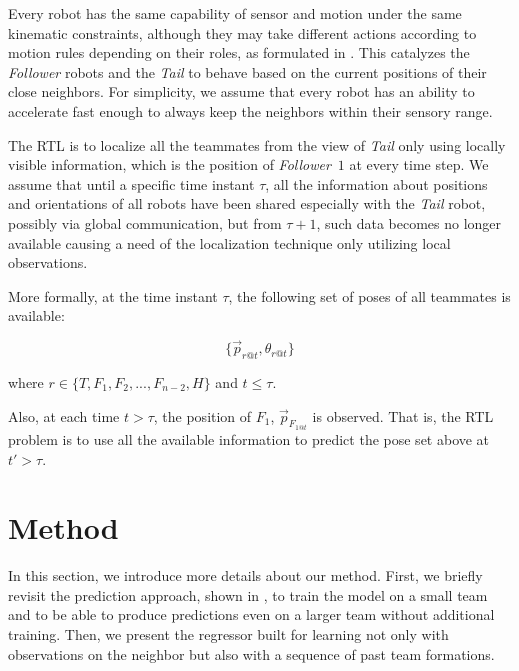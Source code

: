\documentclass[letterpaper, 10 pt, conference]{ieeeconf}  %
\begin{document}
	Every robot has the same capability of sensor and motion under the same 
	kinematic constraints, although they may take different actions according to 
	motion rules depending on their roles, as formulated in \cite{CPR17}. This catalyzes the
	 \emph{Follower} robots and the \emph{Tail} to behave based on the current positions of their close neighbors. For simplicity, we assume that every robot 
	 has an ability to accelerate fast enough to always keep the neighbors within their 
	 sensory range.
	
	The RTL is to localize all the teammates from the view of 
	\emph{Tail} only using locally visible information, which is the position of 
	\emph{Follower}~$1$ at every time step. 	
	We assume that until a specific time instant 
	$\tau$, all the information about positions and orientations of all robots 
	have been shared especially with the \emph{Tail} robot, 
	possibly via global communication,
	but from $\tau+1$, such data becomes no longer available causing a need of the
	localization technique only utilizing local observations.	
	
	More formally, at the time instant $\tau$, the following set of poses of all teammates is 
	available: 
	
	\begin{equation*}
		\{\vec{p}_{r@t},\theta_{r@t}\} 
		\label{eq:pose_set}
	\end{equation*}
	
	where $r \in \{T, F_{1}, F_{2}, ..., F_{n-2}, H\}$ and $t \leq \tau$. 
	
	Also, at each time $t > \tau$, the position of $F_1$, $\vec{p}_{F_{1@t}}$ is observed.  
	That is, the RTL problem is to use all the available information to predict 
	the pose set above at $t' > \tau$. 
	
	
	\section{Method}
	\label{sec:method}
	
	In this section, we introduce more details about our method. First, 
	we briefly revisit the prediction approach, shown in \cite{CPR17}, 
	to train the model on a small team and to be able to produce predictions 
	even on a larger team without additional training. 
	Then, we present the regressor built for learning not only with observations on 
	the neighbor but also with a sequence of past team formations.
\end{document}
